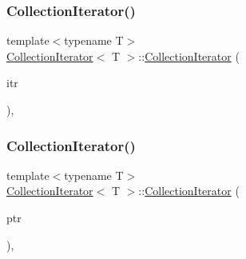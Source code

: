 \mbox{\label{class_collection_iterator_a0507f147322bb135486239871259fce6}} 
\subsubsection{\texorpdfstring{Collection\+Iterator()}{CollectionIterator()}\hspace{0.1cm}{\footnotesize\ttfamily [3/4]}}
{\footnotesize\ttfamily template$<$typename T$>$ \\
\hyperlink{class_collection_iterator}{Collection\+Iterator}$<$ T $>$\+::\hyperlink{class_collection_iterator}{Collection\+Iterator} (\begin{DoxyParamCaption}\item[{\hyperlink{class_collection_iterator}{Collection\+Iterator}$<$ T $>$ \&\&}]{itr }\end{DoxyParamCaption})\hspace{0.3cm}{\ttfamily [inline]}, {\ttfamily [noexcept]}}

\mbox{\label{class_collection_iterator_a538532a008fd442918b5f2f73e9bd2d2}} 
\subsubsection{\texorpdfstring{Collection\+Iterator()}{CollectionIterator()}\hspace{0.1cm}{\footnotesize\ttfamily [4/4]}}
{\footnotesize\ttfamily template$<$typename T$>$ \\
\hyperlink{class_collection_iterator}{Collection\+Iterator}$<$ T $>$\+::\hyperlink{class_collection_iterator}{Collection\+Iterator} (\begin{DoxyParamCaption}\item[{\hyperlink{class_iterator_base}{Iterator\+Base}$<$ T $>$ $\ast$}]{ptr }\end{DoxyParamCaption})\hspace{0.3cm}{\ttfamily [inline]}, {\ttfamily [explicit]}}



